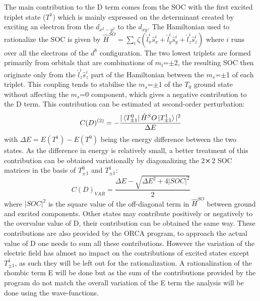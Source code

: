 \documentclass[10pt]{report}
\numberwithin{equation}{section}
\begin{document}
The main contribution to the D term comes from the SOC with the first excited triplet state ($T^1$) which is mainly expressed on the determinant created by exciting an electron from the $d_{x^2-y^2}$ to the $d_{xy}$.
The Hamiltonian used to rationalize the SOC is given by $\hat{H}^{SO}=\sum_{i} \zeta(\hat{l}_x^i\hat{s}_x^i+\hat{l}_y^i\hat{s}_y^i+\hat{l}_z^i\hat{s}_z^i)$ where $i$ runs over all the electrons of the $d^8$ configuration.
The two lowest triplets are formed primarily from orbitals that are combinations of $m_l$=$\pm$2, the resulting SOC then originate only from the $\hat{l}_z^i\hat{s}_z^i$ part of the Hamiltonian between the $m_s$=$\pm$1 of each triplet.
This coupling tends to stabilise the $m_s$=$\pm$1 of the $T_0$ ground state without affecting the $m_s$=0 component, which gives a negative contribution to the D term.
This contribution can be estimated at second-order perturbation:
\begin{equation}\label{ContrPert}
    C(D)^{(2)}=-\frac{|\bra{T^0_{\pm1}}\hat{H}^SO\ket{T^1_{\pm1}}|^2}{\Delta E}
\end{equation}
with $\Delta E = E(T^1)-E(T^0)$ being the energy difference between the two states.
As the difference in energy is relatively small, a better treatment of this contribution can be obtained variationally by diagonalizing the 2$\cross$2 SOC matrices in the basis of $T^0_{\pm1}$ and $T^1_{\pm1}$:
\begin{equation}
    C(D)_{VAR}=\frac{\Delta E -\sqrt{\Delta E^2+4|SOC|^2}}{2}
\end{equation}
where $|SOC|^2$ is the square value of the off-diagonal term in $\hat{H}^{SO}$ between ground and excited components.
Other states may contribute positively or negatively to the overvalue value of D, their contribution can be obtained the same way. 
These contributions are also provided by the ORCA program, to approach the actual value of D one needs to sum all these contributions.
However the variation of the electric field has almost no impact on the contributions of excited states except $T^1_{\pm1}$, as such they will be left out for the rationalization.
A rationalization of the rhombic term E will be done but as the sum of the contributions provided by the program do not match the overall variation of the E term the analysis will be done using the wave-functions.
\end{document}
